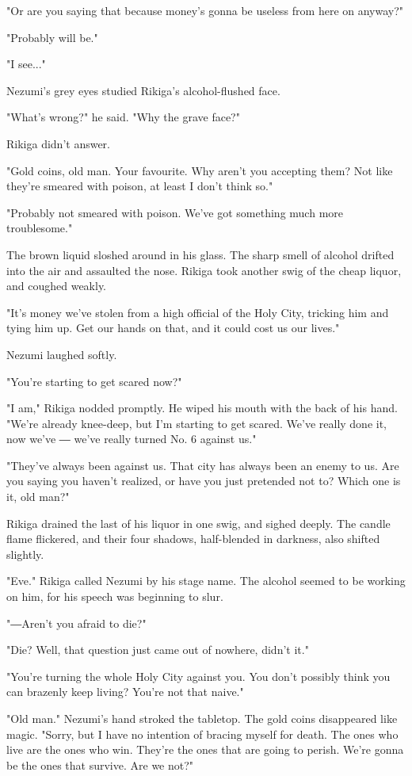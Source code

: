 "Or are you saying that because money's gonna be useless from here on
anyway?"

"Probably will be."

"I see..."

Nezumi's grey eyes studied Rikiga's alcohol-flushed face.

"What's wrong?" he said. "Why the grave face?"

Rikiga didn't answer.

"Gold coins, old man. Your favourite. Why aren't you accepting them? Not
like they're smeared with poison, at least I don't think so."

"Probably not smeared with poison. We've got something much more
troublesome."

The brown liquid sloshed around in his glass. The sharp smell of alcohol
drifted into the air and assaulted the nose. Rikiga took another swig of
the cheap liquor, and coughed weakly.

"It's money we've stolen from a high official of the Holy City, tricking
him and tying him up. Get our hands on that, and it could cost us our
lives."

Nezumi laughed softly.

"You're starting to get scared now?"

"I am," Rikiga nodded promptly. He wiped his mouth with the back of his
hand. "We're already knee-deep, but I'm starting to get scared. We've
really done it, now we've ― we've really turned No. 6 against us."

"They've always been against us. That city has always been an enemy to
us. Are you saying you haven't realized, or have you just pretended not
to? Which one is it, old man?"

Rikiga drained the last of his liquor in one swig, and sighed deeply.
The candle flame flickered, and their four shadows, half-blended in
darkness, also shifted slightly.

"Eve." Rikiga called Nezumi by his stage name. The alcohol seemed to be
working on him, for his speech was beginning to slur.

"―Aren't you afraid to die?"

"Die? Well, that question just came out of nowhere, didn't it."

"You're turning the whole Holy City against you. You don't possibly
think you can brazenly keep living? You're not that naive."

"Old man." Nezumi's hand stroked the tabletop. The gold coins
disappeared like magic. "Sorry, but I have no intention of bracing
myself for death. The ones who live are the ones who win. They're the
ones that are going to perish. We're gonna be the ones that survive. Are
we not?"

